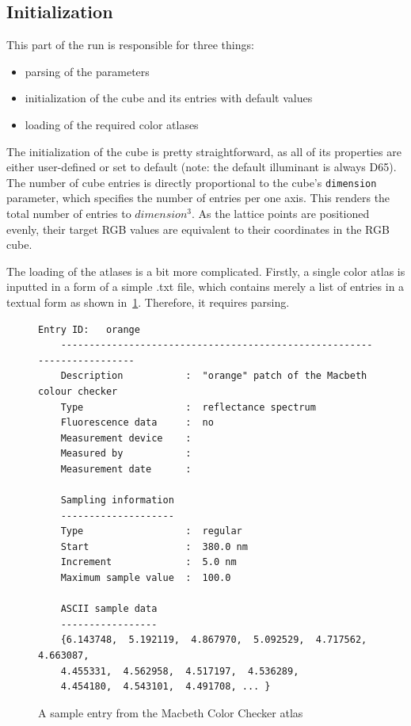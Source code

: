 \subsection{Initialization} \label{ssec:initialization}

This part of the run is responsible for three things:
\begin{itemize}
	\item parsing of the parameters
	\item initialization of the cube and its entries with default values
	\item loading of the required color atlases
\end{itemize}

The initialization of the cube is pretty straightforward, as all of its properties are either user-defined or set to default (note: the default illuminant is always D65). The number of cube entries is directly proportional to the cube's \texttt{dimension} parameter, which specifies the number of entries per one axis. This renders the total number of entries to $dimension^3$. As the lattice points are positioned evenly, their target RGB values are equivalent to their coordinates in the RGB cube.

The loading of the atlases is a bit more complicated. Firstly, a single color atlas is inputted in a form of a simple .txt file, which contains merely a list of entries in a textual form as shown in~\cref{fig:macbethSampleText}. Therefore, it requires parsing.

\begin{figure}
	\begin{lstlisting}[label=lst:atlasEntry]
	Entry ID:   orange
	------------------------------------------------------------------------
	Description           :  "orange" patch of the Macbeth colour checker
	Type                  :  reflectance spectrum
	Fluorescence data     :  no
	Measurement device    :  
	Measured by           :  
	Measurement date      :  
	
	Sampling information
	--------------------
	Type	    	      :  regular
	Start                 :  380.0 nm
	Increment             :  5.0 nm
	Maximum sample value  :  100.0
	
	ASCII sample data
	-----------------
	{6.143748,  5.192119,  4.867970,  5.092529,  4.717562,  4.663087, 
	4.455331,  4.562958,  4.517197,  4.536289,
	4.454180,  4.543101,  4.491708, ... }
	\end{lstlisting}
	\caption{A sample entry from the Macbeth Color Checker atlas}
	\label{fig:macbethSampleText}
\end{figure}

